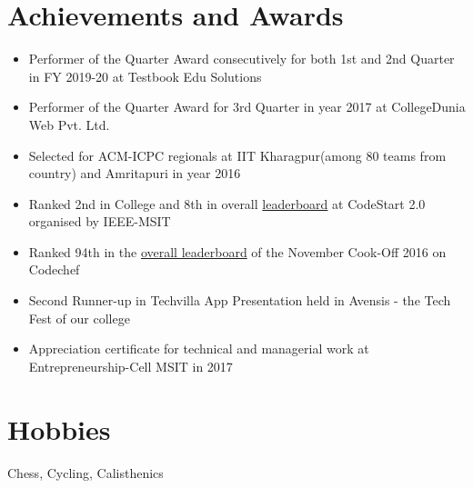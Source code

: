 \documentclass[margin, centered]{res}
\begin{document}
\begin{resume}
\section{Achievements and Awards}
\begin{itemize}[leftmargin=*] 
 \item Performer of the Quarter Award consecutively for both 1st and 2nd Quarter in FY 2019-20 at Testbook Edu Solutions
 \item Performer of the Quarter Award for 3rd Quarter in year 2017 at CollegeDunia Web Pvt. Ltd.
 \item Selected for ACM-ICPC regionals at IIT Kharagpur(among 80 teams from country) and Amritapuri in year 2016
 \item Ranked 2nd in College and 8th in overall \href {https://www.hackerearth.com/CodeStart2/leaderboard/}{leaderboard} at CodeStart 2.0 organised by IEEE-MSIT
 \item Ranked 94th in the \href {https://www.codechef.com/rankings/COOK76}{overall leaderboard} of the November Cook-Off 2016 on Codechef
 \item Second Runner­-up in Techvilla­ App Presentation held in Avensis - the Tech Fest of our college
 \item Appreciation certificate for technical and managerial work at Entrepreneurship-Cell MSIT in 2017
\end{itemize}


\section{Hobbies}
Chess, Cycling, Calisthenics

\end{resume}
\end{document}

